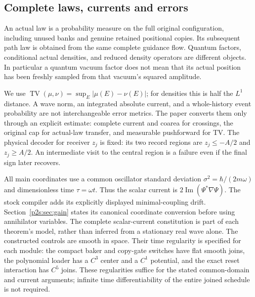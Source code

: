 \documentclass[11pt]{article}
\numberwithin{equation}{section}
\theoremstyle{definition}
\theoremstyle{remark}
\newcommand{\TV}{\operatorname{TV}}
\begin{document}
\subsection{Complete laws, currents and errors}
An actual law is a probability measure on the full original configuration,
including unused banks and genuine retained positional copies. Its
subsequent path law is obtained from the same complete guidance flow.
Quantum factors, conditional actual densities, and reduced density
operators are different objects. In particular a quantum vacuum factor
does not mean that its actual position has been freshly sampled from
that vacuum's squared amplitude.

We use $\TV(\mu,\nu)=\sup_E|\mu(E)-\nu(E)|$; for densities this is half
the $L^1$ distance. A wave norm, an integrated absolute current, and a
whole-history event probability are not interchangeable error metrics.
The paper converts them only through an explicit estimate: complete
current and coarea for crossings, the original cap for actual-law
transfer, and measurable pushforward for TV. The physical decoder for
receiver $z_j$ is fixed: its two record regions are $z_j\leq-A/2$ and
$z_j\geq A/2$. An intermediate visit to the central region is a failure
even if the final sign later recovers.

All main coordinates use a common oscillator standard deviation
$\sigma^2=\hbar/(2m\omega)$ and dimensionless time $\tau=\omega t$.
Thus the scalar current is $2\operatorname{Im}(\Psi^*\nabla\Psi)$.
The stock compiler adds its explicitly displayed minimal-coupling drift.
Section~\ref{p2s:sec:gain} states its canonical coordinate conversion
before using annihilator variables. The complete scalar-current
constitution is part of each theorem's model, rather than inferred
from a stationary real wave alone. The constructed controls are smooth
in space. Their time regularity is specified for each module: the compact
baker and copy-gate switches have flat smooth joins, the polynomial loader
has a $C^3$ center and a $C^1$ potential, and the exact reset interaction
has $C^5$ joins. These regularities suffice for the stated common-domain
and current arguments; infinite time differentiability of the entire
joined schedule is not required.
\end{document}
